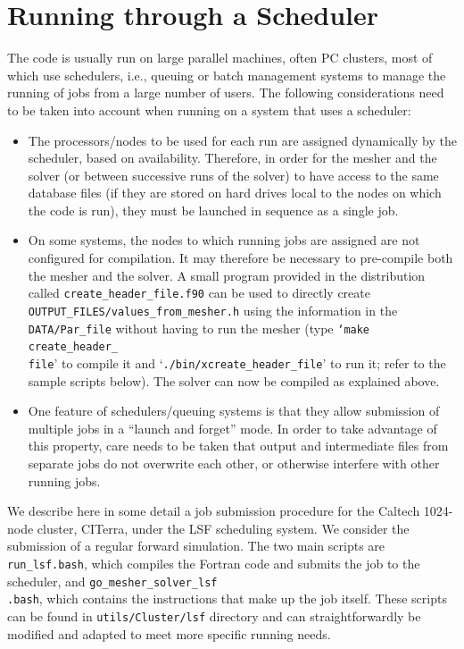 \chapter{Running through a Scheduler}\label{cha:Running-Scheduler}

The code is usually run on large parallel machines, often PC clusters,
most of which use schedulers, i.e., queuing or batch management systems
to manage the running of jobs from a large number of users. The following
considerations need to be taken into account when running on a system
that uses a scheduler:\newline


\begin{itemize}
\item The processors/nodes to be used for each run are assigned dynamically
by the scheduler, based on availability. Therefore, in order for the
mesher and the solver (or between successive runs of the solver) to
have access to the same database files (if they are stored on hard
drives local to the nodes on which the code is run), they must be
launched in sequence as a single job.
\item On some systems, the nodes to which running jobs are assigned are
not configured for compilation. It may therefore be necessary to pre-compile
both the mesher and the solver. A small program provided in the distribution
called \texttt{\small create\_header\_file.f90} can be used to directly
create\texttt{\small{} OUTPUT\_FILES/values\_from\_mesher.h} using
the information in the \texttt{\small DATA/Par\_file} without having
to run the mesher (type \texttt{\small `make}{\small{} }\texttt{\small create\_header\_}~\\
\texttt{\small file}' to compile it and `\texttt{\small ./bin/xcreate\_header\_file}'
to run it; refer to the sample scripts below). The solver can now
be compiled as explained above.
\item One feature of schedulers/queuing systems is that they allow submission
of multiple jobs in a {}``launch and forget'' mode. In order to
take advantage of this property, care needs to be taken that output
and intermediate files from separate jobs do not overwrite each other,
or otherwise interfere with other running jobs.
\end{itemize}
We describe here in some detail a job submission procedure for the
Caltech 1024-node cluster, CITerra, under the LSF scheduling system.
We consider the submission of a regular forward simulation. The two
main scripts are \texttt{\small run\_lsf.bash}, which compiles the
Fortran code and submits the job to the scheduler, and \texttt{\small go\_mesher\_solver\_lsf}~\\
\texttt{\small .bash}, which contains the instructions that make up
the job itself. These scripts can be found in \texttt{\small utils/Cluster/lsf}
directory and can straightforwardly be modified and adapted to meet
more specific running needs.


